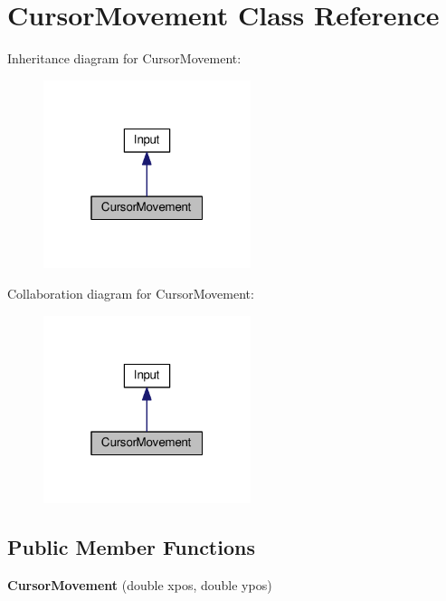 \hypertarget{classCursorMovement}{}\section{Cursor\+Movement Class Reference}
\label{classCursorMovement}


Inheritance diagram for Cursor\+Movement\+:\nopagebreak
\begin{figure}[H]
\begin{center}
\leavevmode
\includegraphics[width=172pt]{classCursorMovement__inherit__graph}
\end{center}
\end{figure}


Collaboration diagram for Cursor\+Movement\+:\nopagebreak
\begin{figure}[H]
\begin{center}
\leavevmode
\includegraphics[width=172pt]{classCursorMovement__coll__graph}
\end{center}
\end{figure}
\subsection*{Public Member Functions}
\begin{DoxyCompactItemize}
\item 
\hypertarget{classCursorMovement_a5d4ae67fcfe792baff996121b694e7c3}{}{\bfseries Cursor\+Movement} (double xpos, double ypos)\label{classCursorMovement_a5d4ae67fcfe792baff996121b694e7c3}

\end{DoxyCompactItemize}
